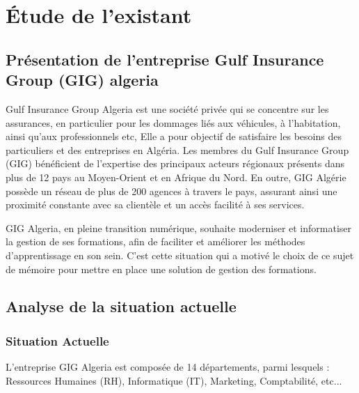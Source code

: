 \documentclass{article}
\begin{document}
\newpage

\section{Étude de l’existant}
\subsection{Présentation de l’entreprise Gulf Insurance Group (GIG) algeria}

\vspace{0,5cm}
\hspace*{1em}Gulf Insurance Group Algeria est une société privée qui se concentre sur les assurances, en particulier pour les dommages liés aux véhicules, à l'habitation, ainsi qu'aux professionnels etc, Elle a pour objectif de satisfaire les besoins des particuliers et des entreprises en Algéria. Les membres du Gulf Insurance Group (GIG) bénéficient de l'expertise des principaux acteurs régionaux présents dans plus de 12 pays au Moyen-Orient et en Afrique du Nord. En outre, GIG Algérie possède un réseau de plus de 200 agences à travers le pays, assurant ainsi une proximité constante avec sa clientèle et un accès facilité à ses services. \cite{GIG}

\vspace{0,3cm}


GIG Algeria, en pleine transition numérique, souhaite moderniser et informatiser la gestion de ses formations, afin de faciliter et améliorer les méthodes d’apprentissage en son sein.
 C'est cette situation qui a motivé le choix de ce sujet de mémoire pour mettre en place une solution de gestion des formations.


\subsection{Analyse de la situation actuelle}
\subsubsection{Situation Actuelle}

\vspace{0,3cm}
\hspace*{1em}L’entreprise GIG Algeria est composée de 14 départements, parmi lesquels : Ressources Humaines (RH), Informatique (IT), Marketing, Comptabilité, etc...
\end{document}
